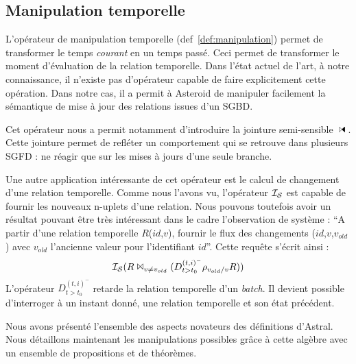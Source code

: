 \subsection{Manipulation temporelle}
L'opérateur de manipulation temporelle (def~\ref{def:manipulation}) permet de transformer le temps \textit{courant} en un temps passé. Ceci permet de transformer le moment d'évaluation de la relation temporelle. Dans l'état actuel de l'art, à notre connaissance, il n'existe pas d'opérateur capable de faire explicitement cette opération. Dans notre cas, il a permit à Asteroid de manipuler facilement la sémantique de mise à jour des relations issues d'un SGBD.

Cet opérateur nous a permit notamment d'introduire la jointure semi-sensible $\ssjoin$. Cette jointure permet de refléter un comportement qui se retrouve dans plusieurs SGFD : ne réagir que sur les mises à jours d'une seule branche.

Une autre application intéressante de cet opérateur est le calcul de changement d'une relation temporelle. Comme nous l'avons vu, l'opérateur $\mathcal{I_S}$ est capable de fournir les nouveaux n-uplets d'une relation. Nous pouvons toutefois avoir un résultat pouvant être très intéressant dans le cadre l'observation de système : \enquote{A partir d'une relation temporelle $R$($id$,$v$), fournir le flux des changements ($id$,$v$,$v_{old}$) avec $v_{old}$ l'ancienne valeur pour l'identifiant $id$}. Cette requête s'écrit ainsi :
$$\mathcal{I_S}(R \Join_{v\neq v_{old}} (D^{(t,i)^-}_{t>t_0}\rho_{v_{old}/v} R))$$
L'opérateur $D^{(t,i)^-}_{t>t_0}$ retarde la relation temporelle d'un \textit{batch}. Il devient possible d'interroger à un instant donné, une relation temporelle et son état précédent.

Nous avons présenté l'ensemble des aspects novateurs des définitions d'Astral. Nous détaillons maintenant les manipulations possibles grâce à cette algèbre avec un ensemble de propositions et de théorèmes.